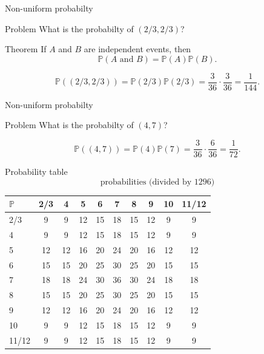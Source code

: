 \documentclass{beamer}
\begin{document}
\begin{frame}{Non-uniform probabilty}
  \begin{block}{Problem}
    What is the probabilty of $(2/3,2/3)$?
  \end{block}
\pause
  \begin{block}{Theorem}
    If $A$ and $B$ are independent events, then
    $$\mathbb{P}(\text{$A$ and $B$}) = \mathbb{P}(A)\mathbb{P}(B).$$
  \end{block}
\pause
  $$\mathbb P((2/3,2/3)) = \mathbb P(2/3)\mathbb P(2/3) = \frac{3}{36}\cdot\frac{3}{36} = \frac{1}{144}.$$
\end{frame}

\begin{frame}{Non-uniform probabilty}
  \begin{block}{Problem}
    What is the probabilty of $(4,7)$?
  \end{block}
\pause
  $$\mathbb P((4,7)) = \mathbb P(4)\mathbb P(7) = \frac{3}{36}\cdot\frac{6}{36} = \frac{1}{72}.$$
\end{frame}

\begin{frame}{Probability table}
  $$\text{probabilities (divided by $1296$)}$$
{\tiny
\begin{center}
  \begin{tabular}{l|c|c|c|c|c|c|c|c|c}
  $\mathbb{P}$ & 2/3 & 4 & 5 & 6 & 7 & 8 & 9 & 10 & 11/12\\\hline
           2/3 & 9 & 9 & 12 & 15 & 18 & 15 & 12 & 9 & 9\\\hline
            4  & 9 & 9 & 12 & 15 & 18 & 15 & 12 & 9 & 9\\\hline
            5  & 12 & 12 & 16 & 20 & 24 & 20 & 16 & 12 & 12\\ \hline
            6  & 15 & 15 & 20 & 25 & 30 & 25 & 20 & 15 & 15\\\hline
            7  & 18 & 18 & 24 & 30 & 36 & 30 & 24 & 18 & 18\\\hline
            8  & 15 & 15 & 20 & 25 & 30 & 25 & 20 & 15 & 15\\\hline
            9  & 12 & 12 & 16 & 20 & 24 & 20 & 16 & 12 & 12\\\hline
           10  & 9 & 9 & 12 & 15 & 18 & 15 & 12 & 9 & 9\\\hline
          11/12& 9 & 9 & 12 & 15 & 18 & 15 & 12 & 9 & 9
  \end{tabular}
\end{center}
}
\end{frame}
\end{document}
